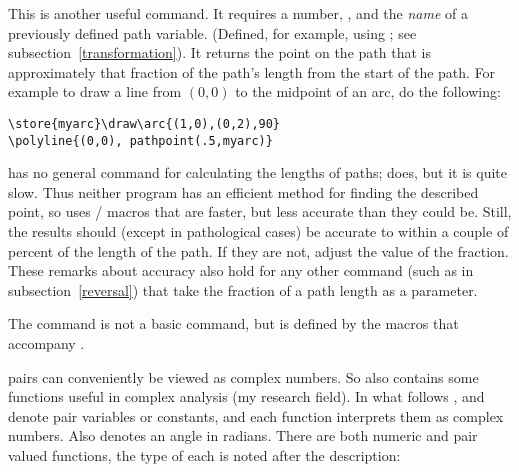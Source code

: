 \documentclass[letterpaper]{article}
\begin{document}
\begin{cd}
\end{cd}
This is another useful \MF{} command. It requires a number, ,
and the \emph{name} of a previously defined \MF{} path variable.
(Defined, for example, using ; see
subsection~\ref{transformation}). It returns the point on the path that
is approximately that fraction of the path's length from the start of
the path. For example to draw a line from $(0,0)$ to the midpoint of an
arc, do the following:
\begin{verbatim}
\store{myarc}\draw\arc{(1,0),(0,2),90}
\polyline{(0,0), pathpoint(.5,myarc)}
\end{verbatim}
\CMF{} has no general command for calculating the lengths of paths;
\CMP{} does, but it is quite slow. Thus neither program has an efficient
method for finding the described point, so \mfp{} uses \MF\slash\MP{} macros
that are faster, but less accurate than they could be. Still, the
results should (except in pathological cases) be accurate to within a
couple of percent of the length of the path. If they are not, adjust the
value of the fraction. These remarks about accuracy also hold for any
other command (such as  in subsection~\ref{reversal}) that
take the fraction of a path length as a parameter.

The  command is not a basic \MF{} command, but is defined
by the  macros that accompany \mfp{}.

\MF{} pairs can conveniently be viewed as complex numbers. So
 also contains some functions useful in complex analysis
(my research field). In what follows ,  and  denote
pair variables or constants, and each function interprets them as
complex numbers. Also  denotes an angle in radians. There are
both numeric and pair valued functions, the type of each is noted after
the description:

\def\Arg{\mathop{\mathrm{Arg}}}
\end{document}
